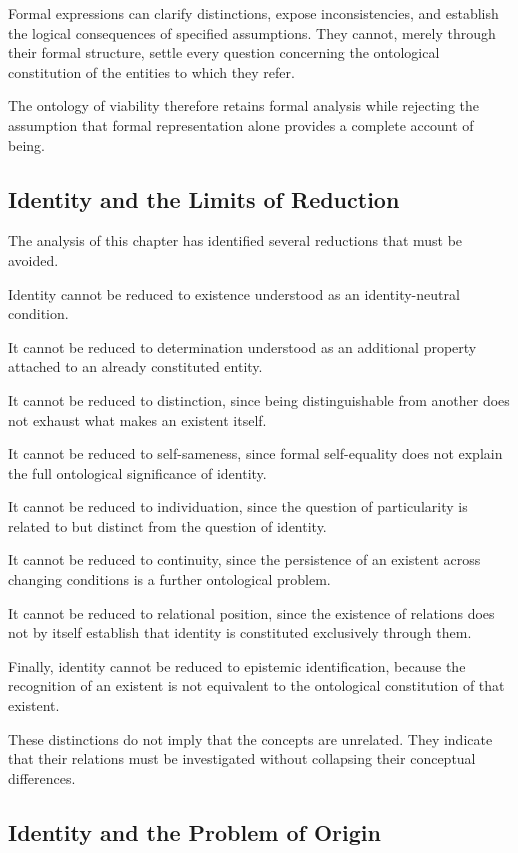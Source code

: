 Formal expressions can clarify distinctions, expose inconsistencies, and establish the logical consequences of specified assumptions. They cannot, merely through their formal structure, settle every question concerning the ontological constitution of the entities to which they refer.

The ontology of viability therefore retains formal analysis while rejecting the assumption that formal representation alone provides a complete account of being.

\subsection{Identity and the Limits of Reduction}

The analysis of this chapter has identified several reductions that must be avoided.

Identity cannot be reduced to existence understood as an identity-neutral condition.

It cannot be reduced to determination understood as an additional property attached to an already constituted entity.

It cannot be reduced to distinction, since being distinguishable from another does not exhaust what makes an existent itself.

It cannot be reduced to self-sameness, since formal self-equality does not explain the full ontological significance of identity.

It cannot be reduced to individuation, since the question of particularity is related to but distinct from the question of identity.

It cannot be reduced to continuity, since the persistence of an existent across changing conditions is a further ontological problem.

It cannot be reduced to relational position, since the existence of relations does not by itself establish that identity is constituted exclusively through them.

Finally, identity cannot be reduced to epistemic identification, because the recognition of an existent is not equivalent to the ontological constitution of that existent.

These distinctions do not imply that the concepts are unrelated. They indicate that their relations must be investigated without collapsing their conceptual differences.

\subsection{Identity and the Problem of Origin}

